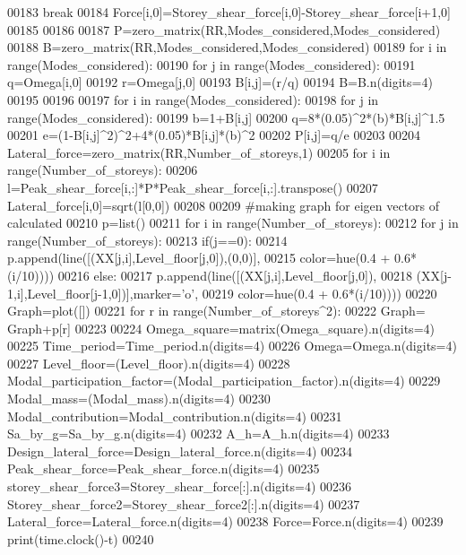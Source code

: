 \begin{DoxyCode}
00183        break
00184    Force[i,0]=Storey\_shear\_force[i,0]-Storey\_shear\_force[i+1,0]
00185     
00186  
00187 P=zero\_matrix(RR,Modes\_considered,Modes\_considered)
00188 B=zero\_matrix(RR,Modes\_considered,Modes\_considered)
00189 for i in range(Modes\_considered):
00190    for j in range(Modes\_considered):
00191        q=Omega[i,0]
00192        r=Omega[j,0]
00193        B[i,j]=(r/q)
00194 B=B.n(digits=4)
00195 
00196 
00197 for i in range(Modes\_considered):
00198    for j in range(Modes\_considered):
00199        b=1+B[i,j]
00200        q=8*(0.05)^2*(b)*B[i,j]^1.5
00201        e=(1-B[i,j]^2)^2+4*(0.05)*B[i,j]*(b)^2
00202        P[i,j]=q/e
00203    
00204 Lateral\_force=zero\_matrix(RR,Number\_of\_storeys,1)
00205 for i in range(Number\_of\_storeys):
00206    l=Peak\_shear\_force[i,:]*P*Peak\_shear\_force[i,:].transpose()
00207    Lateral\_force[i,0]=sqrt(l[0,0])
00208 
00209 #making graph for eigen vectors of calculated
00210 p=list()
00211 for i in range(Number\_of\_storeys):
00212    for j in range(Number\_of\_storeys):
00213        if(j==0):
00214            p.append(line([(XX[j,i],Level\_floor[j,0]),(0,0)],
00215            color=hue(0.4 + 0.6*(i/10))))
00216        else:
00217            p.append(line([(XX[j,i],Level\_floor[j,0]),
00218            (XX[j-1,i],Level\_floor[j-1,0])],marker='o',
00219            color=hue(0.4 + 0.6*(i/10))))
00220 Graph=plot([])
00221 for r in range(Number\_of\_storeys^2):
00222    Graph= Graph+p[r]
00223 
00224 Omega\_square=matrix(Omega\_square).n(digits=4)
00225 Time\_period=Time\_period.n(digits=4)
00226 Omega=Omega.n(digits=4)
00227 Level\_floor=(Level\_floor).n(digits=4)
00228 Modal\_participation\_factor=(Modal\_participation\_factor).n(digits=4)
00229 Modal\_mass=(Modal\_mass).n(digits=4)
00230 Modal\_contribution=Modal\_contribution.n(digits=4)
00231 Sa\_by\_g=Sa\_by\_g.n(digits=4)
00232 A\_h=A\_h.n(digits=4)
00233 Design\_lateral\_force=Design\_lateral\_force.n(digits=4)
00234 Peak\_shear\_force=Peak\_shear\_force.n(digits=4)
00235 storey\_shear\_force3=Storey\_shear\_force[:].n(digits=4)
00236 Storey\_shear\_force2=Storey\_shear\_force2[:].n(digits=4)
00237 Lateral\_force=Lateral\_force.n(digits=4)
00238 Force=Force.n(digits=4)
00239 print(time.clock()-t)
00240 
\end{DoxyCode}
